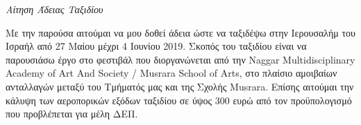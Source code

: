 \noindent
\emph{Αίτηση Άδειας Ταξιδίου}

\vspace{1cm}

\noindent
Με την παρούσα αιτούμαι να μου δοθεί άδεια ώστε να ταξιδέψω στην Ιερουσαλήμ του Ισραήλ από 27 Μαίου μέχρι 4 Ιουνίου 2019. Σκοπός του ταξιδίου είναι να παρουσιάσω έργο στο φεστιβάλ που διοργανώνεται από την Naggar Multidisciplinary Academy of Art And Society / Musrara School of Arts, στο πλαίσιο αμοιβαίων ανταλλαγών μεταξύ του Τμήματός μας και της Σχολής Musrara.  Επίσης αιτούμαι την κάλυψη των αεροπορικών εξόδων ταξιδίου σε ύψος 300 ευρώ από τον προϋπολογισμό που προβλέπεται για μέλη ΔΕΠ.
